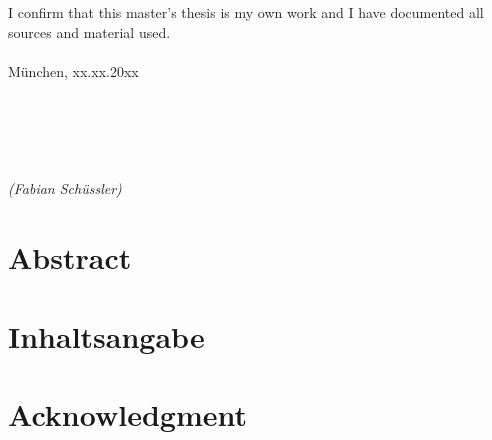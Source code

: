 \documentclass[12pt]{report}
\begin{document}
\newpage	
\thispagestyle{empty}
\hoffset=0mm
\vspace*{\fill}
\noindent I confirm that this master's thesis is my own work and I have documented all sources and material used.\\\\
München, xx.xx.20xx\\\\\\\\\\\\
\noindent \textit{(Fabian Schüssler)}

\newpage
\thispagestyle{empty}
\null

\newpage
\thispagestyle{empty}
\hoffset=0mm
\section*{Abstract}	
\begin{spacing}{1.2}

\end{spacing}
 
\newpage
\thispagestyle{empty}
\hoffset=0mm
\section*{Inhaltsangabe}
\begin{spacing}{1.2}

\end{spacing}

\newpage
\thispagestyle{empty}
\hoffset=0mm
\section*{Acknowledgment}	
\begin{spacing}{1.2}

\end{spacing}

\newpage
\setcounter{page}{1}
\hoffset=0mm
\fboxsep 0mm

\tableofcontents
\setcounter{tocdepth}{2}

\listoffigures
{}

\listoftables
{}

\printglossary[type=\acronymtype,style=long ,title=Abbreviations, toctitle=Abbreviations,nonumberlist]
\printglossary[type=symbolslist,style=long ,title=Symbols, nonumberlist]

\newpage
\setlength{\baselineskip}{3ex}
\begin{spacing}{1.15}






\end{spacing}

\newpage


\newpage

\def\UrlBreaks{\do\/\do-}



\end{document}
